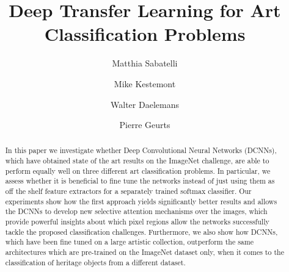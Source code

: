 \documentclass[runningheads]{llncs}
\begin{document}
%
\title{Deep Transfer Learning for Art Classification Problems}

%
\author{Matthia Sabatelli \and
Mike Kestemont \and
Walter Daelemans \and
Pierre Geurts}
%
%

%
\maketitle              %
%
\begin{abstract}

In this paper we investigate whether Deep Convolutional Neural Networks (DCNNs), which have obtained state of the art results on the ImageNet challenge, are able to perform equally well on three different art classification problems. In particular, we assess whether it is beneficial to fine tune the networks instead of just using them as off the shelf feature extractors for a separately trained softmax classifier. Our experiments show how the first approach yields significantly better results and allows the DCNNs to develop new selective attention mechanisms over the images, which provide powerful insights about which pixel regions allow the networks successfully tackle the proposed classification challenges. Furthermore, we also show how DCNNs, which have been fine tuned on a large artistic collection, outperform the same architectures which are pre-trained on the ImageNet dataset only, when it comes to the classification of heritage objects from a different dataset.

\end{abstract}
\end{document}
